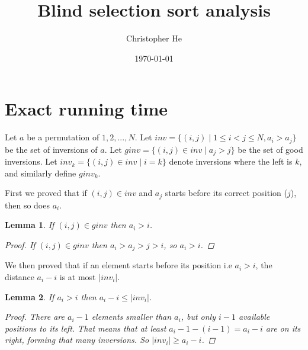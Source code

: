 \documentclass{article}
\title{Blind selection sort analysis}
\author{Christopher He}
\date{\today}
\newtheorem{lemma}{Lemma}
\begin{document}
\maketitle
\section{Exact running time}

Let $a$ be a permutation of $1,2, ..., N$.
Let $inv = \{(i, j) \mid 1 \leq i < j \leq N, a_i > a_j \}$ be the set of inversions of $a$.
Let $ginv = \{(i, j) \in inv \mid a_j > j\}$ be the set of good inversions.
Let $inv_k = \{(i, j) \in inv \mid i = k\}$ denote inversions where the left is $k$,
and similarly define $ginv_k$.

First we proved that if $(i, j) \in inv$ and $a_j$ starts before its correct position ($j$), then
so does $a_i$.

\begin{lemma}
    If $(i, j) \in ginv$ then $a_i > i$.
    \begin{proof}
        If $(i, j) \in ginv$ then $a_i > a_j > j > i$, so $a_i > i$.
    \end{proof}
\end{lemma}

We then proved that if an element starts before its position i.e $a_i > i$, the distance $a_i - i$ is 
at most $\vert inv_i \vert$.

\begin{lemma} If $a_i > i$ then $a_i - i \leq \vert inv_i \vert$.
    \begin{proof} There are $a_i - 1$ elements smaller than $a_i$, but only $i - 1$ available positions to its left. That means that at least $a_i - 1 - (i - 1) = a_i - i $ are on its right, forming that many inversions. So $ \vert inv_i \vert \geq a_i - i$.
    \end{proof}
\end{lemma}
\end{document}
